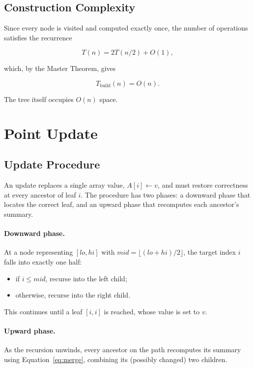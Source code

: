 \documentclass[11pt]{article}
\begin{document}
\subsection{Construction Complexity}
Since every node is visited and computed exactly once, the number of operations satisfies the recurrence

\begin{equation}
T(n) = 2T(n/2) + O(1),
\end{equation}

which, by the Master Theorem, gives

\begin{equation}
\boxed{T_{\text{build}}(n) = O(n)}.
\end{equation}

The tree itself occupies $O(n)$ space.

\section{Point Update}

\subsection{Update Procedure}
An update replaces a single array value, $A[i] \leftarrow v$, and must restore correctness at every ancestor of leaf $i$. The procedure has two phases: a downward phase that locates the correct leaf, and an upward phase that recomputes each ancestor's summary.

\paragraph{Downward phase.} At a node representing $[lo, hi]$ with $mid = \lfloor (lo+hi)/2 \rfloor$, the target index $i$ falls into exactly one half:
\begin{itemize}[nosep]
  \item if $i \le mid$, recurse into the left child;
  \item otherwise, recurse into the right child.
\end{itemize}
This continues until a leaf $[i,i]$ is reached, whose value is set to $v$.

\paragraph{Upward phase.} As the recursion unwinds, every ancestor on the path recomputes its summary using Equation~\eqref{eq:merge}, combining its (possibly changed) two children.
\end{document}
